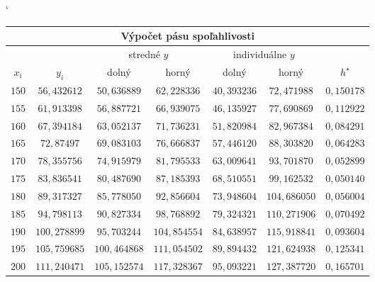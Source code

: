 \documentclass[pdftex, 11pt, a4paper, titlepage]{article}
\begin{document}
    \begin{table}[H]
        \catcode`
        \begin{tabular}{|c|c|c|c|c|c|c|}
            \hline
            \multicolumn{7}{|c|}{Výpočet pásu spoľahlivosti}\\
            \hline
            \multicolumn{2}{|c}{}& \multicolumn{2}{|c|}{stredné $y$} & \multicolumn{2}{c|}{individuálne $y$} & \\
            \hline
            $x_i$ & $y_i$ & dolný & horný & dolný & horný & $h^\star$ \\
            \hline
            $150$ & $56,432612$     & $50,636889$   & $62,228336$   & $40,393236$   & $72,471988$   & $0,150178$ \\
            $155$ & $61,913398$     & $56,887721$   & $66,939075$   & $46,135927$   & $77,690869$   & $0,112922$ \\
            $160$ & $67,394184$     & $63,052137$   & $71,736231$   & $51,820984$   & $82,967384$   & $0,084291$ \\
            $165$ & $72,87497$      & $69,083103$   & $76,666837$   & $57,446120$   & $88,303820$   & $0,064283$ \\
            $170$ & $78,355756$     & $74,915979$   & $81,795533$   & $63,009641$   & $93,701870$   & $0,052899$ \\
            $175$ & $83,836541$     & $80,487690$   & $87,185393$   & $68,510551$   & $99,162532$   & $0,050140$ \\
            $180$ & $89,317327$     & $85,778050$   & $92,856604$   & $73,948604$   & $104,686050$  & $0,056004$ \\
            $185$ & $94,798113$     & $90,827334$   & $98,768892$   & $79,324321$   & $110,271906$  & $0,070492$ \\
            $190$ & $100,278899$    & $95,703244$   & $104,854554$  & $84,638957$   & $115,918841$  & $0,093604$ \\
            $195$ & $105,759685$    & $100,464868$  & $111,054502$  & $89,894432$   & $121,624938$  & $0,125341$ \\
            $200$ & $111,240471$    & $105,152574$  & $117,328367$  & $95,093221$   & $127,387720$  & $0,165701$ \\
            \hline
        \end{tabular}
    \end{table}
\end{document}
